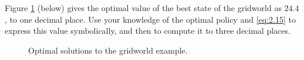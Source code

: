 
\begin{exercise}[Exercise 3.24]

Figure \ref{fig:2.21} (below) gives the optimal value of the best state of the gridworld as $24.4$, to one decimal place.
Use your knowledge of the optimal policy and \eqref{eq:2.15} to express this value symbolically, and then to compute it to three decimal places.

\begin{figure}[H]
    \centering
    \hspace{1cm}
    \hspace{1cm}
    \hspace{0mm}
    \caption
    {
        Optimal solutions to the gridworld example.
    }
    \label{fig:2.21}
\end{figure}

\end{exercise}


